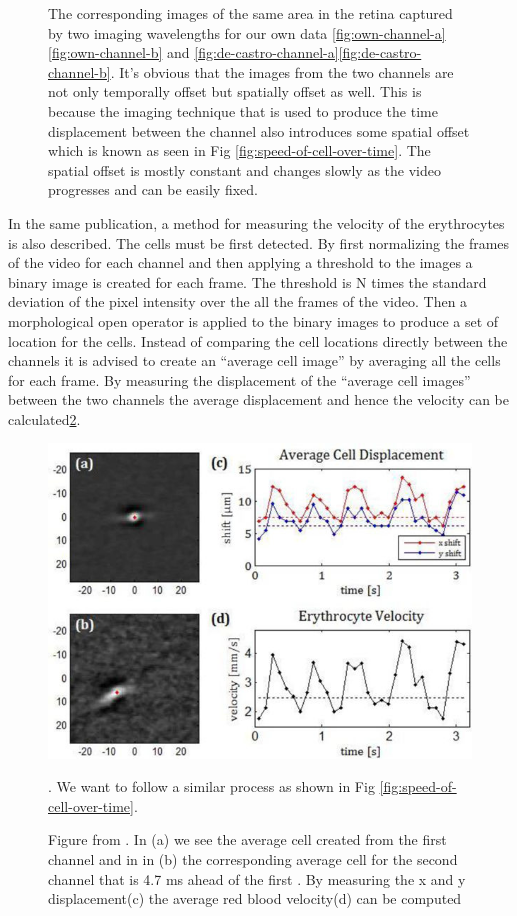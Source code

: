 \documentclass[]{article}
\begin{document}
\begin{figure}[ht]
	\caption{The corresponding images of the same area in the retina captured by two imaging
		wavelengths for our own data \ref{fig:own-channel-a}\ref{fig:own-channel-b} and \ref{fig:de-castro-channel-a}\ref{fig:de-castro-channel-b}.
		It's obvious that the images from the two channels are not only temporally offset but
		spatially offset as well.
		This is because the imaging technique that is used to produce the time displacement between the channel also introduces some spatial offset which is known as seen in Fig \ref{fig:speed-of-cell-over-time}.
		The spatial offset is mostly constant and changes slowly as the video progresses and 
		can be easily fixed. 
	}
	\label{fig:corresponding-channels}
\end{figure}

In the same publication, a method for measuring the velocity of the erythrocytes is also described. %
The cells must be first detected.
By first normalizing the frames of the video for each channel and then applying a threshold to the images a binary image is created for each frame.
The threshold is N times the standard deviation of the pixel intensity over the all the frames of the video.
Then a morphological open operator is applied to the binary images to produce a set of location for the cells.
Instead of comparing the cell locations directly between the channels it is advised to create an ``average cell image'' by averaging all the cells for each frame.
By measuring the displacement of the ``average cell images'' between the two channels the average displacement and hence the velocity can be calculated\ref{fig:castro-average-cell}.

\begin{figure}[ht]
 	\centering
 	\includegraphics[width=0.5\textheight]{castro-average-cell.png}
 	\caption{Figure from \cite{castro_rapid_2016}.
 		In (a) we see the average cell created from the first channel and in
 		in (b) the corresponding average cell for the second channel that is 4.7 ms ahead
 		of the first .
 		By measuring the 
 		x and y displacement(c) the average red blood velocity(d) can be computed}.
 	 	We want to follow a similar process as shown in Fig \ref{fig:speed-of-cell-over-time}.
 	\label{fig:castro-average-cell}
\end{figure}
\end{document}
